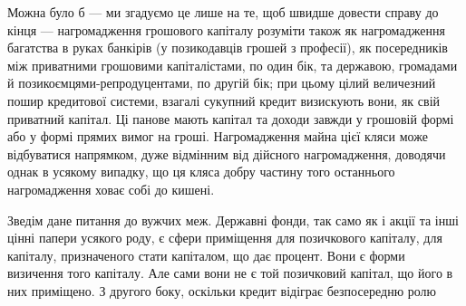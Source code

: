 Можна було б — ми згадуємо це лише на те, щоб швидше довести справу
до кінця — нагромадження грошового капіталу розуміти також як нагромадження
багатства в руках банкірів (у позикодавців грошей з професії), як посередників
між приватними грошовими капіталістами, по один бік, та державою, громадами
й позикоємцями-репродуцентами, по другій бік; при цьому цілий величезний
пошир кредитової системи, взагалі сукупний кредит визискують вони, як свій приватний
капітал. Ці панове мають капітал та доходи завжди у грошовій формі
або у формі прямих вимог на гроші. Нагромадження майна цієї кляси може
відбуватися напрямком, дуже відмінним від дійсного нагромадження, доводячи
однак в усякому випадку, що ця кляса добру частину того останнього нагромадження
ховає собі до кишені.

Зведім дане питання до вужчих меж. Державні фонди, так само як і акції та
інші цінні папери усякого роду, є сфери приміщення для позичкового капіталу,
для капіталу, призначеного стати капіталом, що дає процент. Вони є форми визичення
того капіталу. Але сами вони не є той позичковий капітал, що його
в них приміщено. З другого боку, оскільки кредит відіграє безпосередню ролю